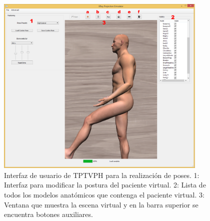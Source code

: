 \begin{figure}
    \centering
    \includegraphics[width=0.9\textwidth]{IMG/posingui.png}
    \caption{Interfaz de usuario de \ac{TPTVPH} para la realización de poses. 1: Interfaz para modificar la postura del paciente virtual. 2: Lista de todos los modelos anatómicos que contenga el paciente virtual. 3: Ventana que muestra la escena virtual y en la barra superior se encuentra botones auxiliares.}
    \label{fig:posui}
\end{figure}

